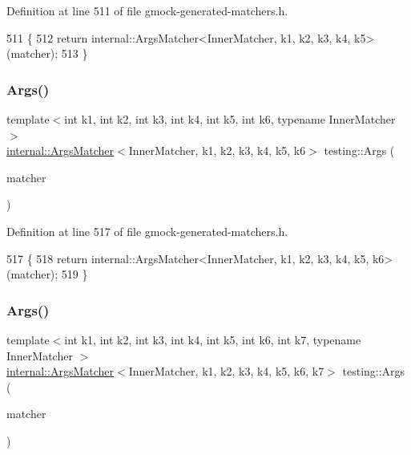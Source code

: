 Definition at line 511 of file gmock-\/generated-\/matchers.\+h.


\begin{DoxyCode}
511                                   \{
512   \textcolor{keywordflow}{return} internal::ArgsMatcher<InnerMatcher, k1, k2, k3, k4, k5>(matcher);
513 \}
\end{DoxyCode}
\mbox{\label{namespacetesting_abc92e87b4a9cad372b082d81479f3d48}} 
\subsubsection{\texorpdfstring{Args()}{Args()}\hspace{0.1cm}{\footnotesize\ttfamily [7/11]}}
{\footnotesize\ttfamily template$<$int k1, int k2, int k3, int k4, int k5, int k6, typename Inner\+Matcher $>$ \\
\hyperlink{classtesting_1_1internal_1_1ArgsMatcher}{internal\+::\+Args\+Matcher}$<$Inner\+Matcher, k1, k2, k3, k4, k5, k6$>$ testing\+::\+Args (\begin{DoxyParamCaption}\item[{const Inner\+Matcher \&}]{matcher }\end{DoxyParamCaption})\hspace{0.3cm}{\ttfamily [inline]}}



Definition at line 517 of file gmock-\/generated-\/matchers.\+h.


\begin{DoxyCode}
517                                   \{
518   \textcolor{keywordflow}{return} internal::ArgsMatcher<InnerMatcher, k1, k2, k3, k4, k5, k6>(matcher);
519 \}
\end{DoxyCode}
\mbox{\label{namespacetesting_a9a9ef7a866b397430527076e342817f9}} 
\subsubsection{\texorpdfstring{Args()}{Args()}\hspace{0.1cm}{\footnotesize\ttfamily [8/11]}}
{\footnotesize\ttfamily template$<$int k1, int k2, int k3, int k4, int k5, int k6, int k7, typename Inner\+Matcher $>$ \\
\hyperlink{classtesting_1_1internal_1_1ArgsMatcher}{internal\+::\+Args\+Matcher}$<$Inner\+Matcher, k1, k2, k3, k4, k5, k6, k7$>$ testing\+::\+Args (\begin{DoxyParamCaption}\item[{const Inner\+Matcher \&}]{matcher }\end{DoxyParamCaption})\hspace{0.3cm}{\ttfamily [inline]}}



